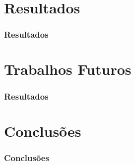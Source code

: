 \section{Resultados}
\begin{frame}
	\frametitle{Resultados}
	
	
	
	
\end{frame}
\section{Trabalhos Futuros}
\begin{frame}
	\frametitle{Resultados}
	
	
	
	
\end{frame}
\section{Conclusões}
\begin{frame}
	\frametitle{Conclusões}
	
	
	
	
\end{frame}





















